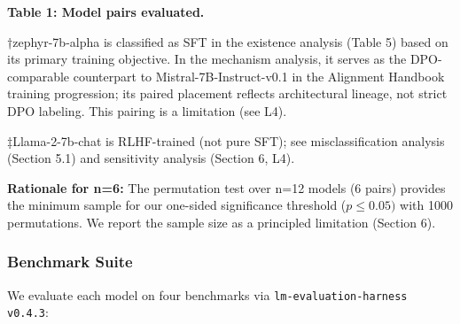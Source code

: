 \begin{table}[htbp]
\centering
{}
\end{table}

\textbf{Table 1: Model pairs evaluated.}

†zephyr-7b-alpha is classified as SFT in the existence analysis (Table 5) based on its
primary training objective. In the mechanism analysis, it serves as the DPO-comparable
counterpart to Mistral-7B-Instruct-v0.1 in the Alignment Handbook training progression;
its paired placement reflects architectural lineage, not strict DPO labeling. This
pairing is a limitation (see L4).

‡Llama-2-7b-chat is RLHF-trained (not pure SFT); see misclassification analysis
(Section 5.1) and sensitivity analysis (Section 6, L4).

\textbf{Rationale for n=6:} The permutation test over n=12 models (6 pairs) provides the
minimum sample for our one-sided significance threshold ($p\leq 0.05)$ with 1000 permutations.
We report the sample size as a principled limitation (Section 6).

\subsubsection{Benchmark Suite}

We evaluate each model on four benchmarks via \texttt{lm-evaluation-harness v0.4.3}:

\begin{table}[htbp]
\centering
{}
\end{table}

